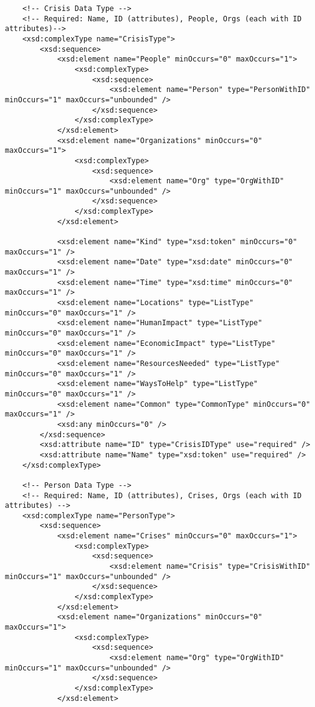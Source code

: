 \documentclass{article}
\begin{document}
\begin{lstlisting}
    <!-- Crisis Data Type -->
    <!-- Required: Name, ID (attributes), People, Orgs (each with ID attributes)-->
    <xsd:complexType name="CrisisType">
        <xsd:sequence>
            <xsd:element name="People" minOccurs="0" maxOccurs="1">
                <xsd:complexType>
                    <xsd:sequence>
                        <xsd:element name="Person" type="PersonWithID" minOccurs="1" maxOccurs="unbounded" />
                    </xsd:sequence>
                </xsd:complexType>
            </xsd:element>
            <xsd:element name="Organizations" minOccurs="0" maxOccurs="1">
                <xsd:complexType>
                    <xsd:sequence>
                        <xsd:element name="Org" type="OrgWithID" minOccurs="1" maxOccurs="unbounded" />
                    </xsd:sequence>
                </xsd:complexType>
            </xsd:element>
            
            <xsd:element name="Kind" type="xsd:token" minOccurs="0" maxOccurs="1" />
            <xsd:element name="Date" type="xsd:date" minOccurs="0" maxOccurs="1" />
            <xsd:element name="Time" type="xsd:time" minOccurs="0" maxOccurs="1" />
            <xsd:element name="Locations" type="ListType" minOccurs="0" maxOccurs="1" />
            <xsd:element name="HumanImpact" type="ListType" minOccurs="0" maxOccurs="1" />
            <xsd:element name="EconomicImpact" type="ListType" minOccurs="0" maxOccurs="1" />
            <xsd:element name="ResourcesNeeded" type="ListType" minOccurs="0" maxOccurs="1" />
            <xsd:element name="WaysToHelp" type="ListType" minOccurs="0" maxOccurs="1" />
            <xsd:element name="Common" type="CommonType" minOccurs="0" maxOccurs="1" />
            <xsd:any minOccurs="0" />
        </xsd:sequence>
        <xsd:attribute name="ID" type="CrisisIDType" use="required" />
        <xsd:attribute name="Name" type="xsd:token" use="required" />
    </xsd:complexType>
    
    <!-- Person Data Type -->
    <!-- Required: Name, ID (attributes), Crises, Orgs (each with ID attributes) -->
    <xsd:complexType name="PersonType">
        <xsd:sequence>
            <xsd:element name="Crises" minOccurs="0" maxOccurs="1">
                <xsd:complexType>
                    <xsd:sequence>
                        <xsd:element name="Crisis" type="CrisisWithID" minOccurs="1" maxOccurs="unbounded" />
                    </xsd:sequence>
                </xsd:complexType>
            </xsd:element>
            <xsd:element name="Organizations" minOccurs="0" maxOccurs="1">
                <xsd:complexType>
                    <xsd:sequence>
                        <xsd:element name="Org" type="OrgWithID" minOccurs="1" maxOccurs="unbounded" />
                    </xsd:sequence>
                </xsd:complexType>
            </xsd:element>
            

\end{lstlisting}
\end{document}
